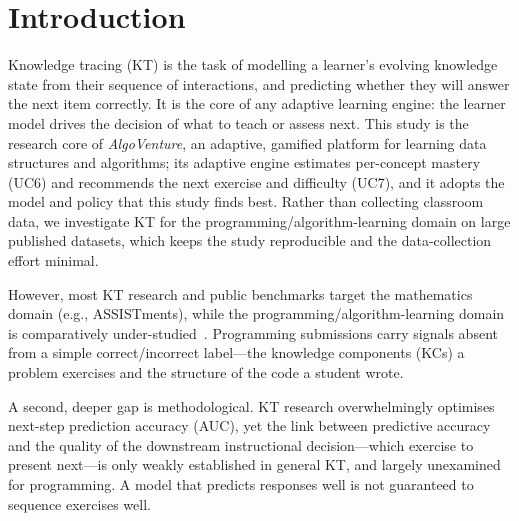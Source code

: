 \section{Introduction}
\label{sec:intro}

Knowledge tracing (KT) is the task of modelling a learner's evolving
knowledge state from their sequence of interactions, and predicting
whether they will answer the next item correctly. It is the core of any
adaptive learning engine: the learner model drives the decision of what
to teach or assess next. This study is the research core of
\emph{AlgoVenture}, an adaptive, gamified platform for learning data
structures and algorithms; its adaptive engine estimates per-concept
mastery (UC6) and recommends the next exercise and difficulty (UC7), and
it adopts the model and policy that this study finds best. Rather than
collecting classroom data, we investigate KT for the
programming/algorithm-learning domain on large published datasets, which
keeps the study reproducible and the data-collection effort minimal.

However, most KT research and public benchmarks target the mathematics
domain (e.g., ASSISTments), while the programming/algorithm-learning
domain is comparatively under-studied~\cite{piech2015dkt,liu2023simplekt}.
Programming submissions carry signals absent from a simple
correct/incorrect label---the knowledge components (KCs) a problem
exercises and the structure of the code a student wrote.

A second, deeper gap is methodological. KT research overwhelmingly
optimises next-step prediction accuracy (AUC), yet the link between
predictive accuracy and the quality of the downstream instructional
decision---which exercise to present next---is only weakly established
in general KT, and largely unexamined for programming. A model that
predicts responses well is not guaranteed to sequence exercises well.


